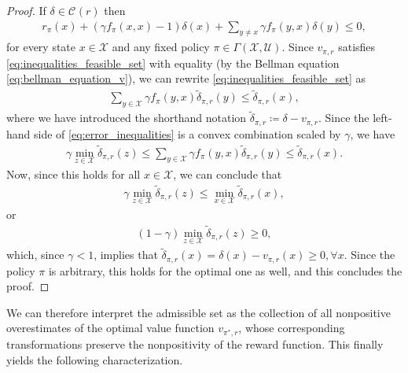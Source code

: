 \documentclass[10pt,leqno]{amsart}
\newcommand{\U}{\mathcal{U}}
\newcommand{\X}{\mathcal{X}}
\newcommand{\cost}{r}
\newcommand{\costfb}[1]{\cost_{#1}}
\newcommand{\vvarg}[1]{v_{#1}}
\newcommand{\f}{f}
\newcommand{\ffb}[1]{\f_{#1}}
\newcommand{\policy}{\pi}
\newcommand{\Sect}{\Gamma(\X, \U)}
\newcommand{\state}{x} %
\newcommand{\disc}{\gamma}
\newcommand{\advset}[2]{\mathcal{C}_{#1}(#2)}
\begin{document}
\begin{proof}
    If $\delta \in \advset{}{\cost}$ then
    \begin{align}\label{eq:inequalities_feasible_set}
        \costfb{\policy}(\state) + (\disc \text{$\ffb{\policy}(\state, \state)$} - 1) \delta(\state) + \sum_{y \neq \state} \disc \ffb{\policy}(y, \state) \delta(y) \leq 0,
    \end{align}
    for every state $\state \in \X$ and any fixed policy $\policy \in \Sect$. Since $\vvarg{\policy\!, \cost}$ satisfies \eqref{eq:inequalities_feasible_set} with equality (by the Bellman equation \eqref{eq:bellman_equation_v}), we can rewrite \eqref{eq:inequalities_feasible_set} as
    \begin{align}\label{eq:error_inequalities}
        \sum_{y \in \X} \disc \ffb{\policy}(y, \state) \tilde{\delta}_{\policy, \cost}(y) \leq \tilde{\delta}_{\policy, \cost}(\state),
    \end{align}
    where we have introduced the shorthand notation $\tilde{\delta}_{\policy, \cost} \coloneqq \delta - \vvarg{\policy\!, \cost}$. Since the left-hand side of \eqref{eq:error_inequalities} is a convex combination scaled by $\disc$, we have
    \begin{align*}
        \disc \min_{z \in \X} \tilde{\delta}_{\policy, \cost}(z) \leq \sum_{y \in \X} \disc \ffb{\policy}(y, \state) \tilde{\delta}_{\policy, \cost}(y) \leq \tilde{\delta}_{\policy, \cost}(\state).
    \end{align*}
    Now, since this holds for all $\state \in \X$, we can conclude that
    \begin{align*}
        \disc \min_{z \in \X} \tilde{\delta}_{\policy, \cost}(z) \leq \min_{x \in \X} \tilde{\delta}_{\policy, \cost}(x),
    \end{align*}
    or
    \begin{align*}
        (1 - \disc)\min_{z \in \X} \tilde{\delta}_{\policy, \cost}(z) \geq 0,
    \end{align*}
    which, since $\disc < 1$, implies that $\tilde{\delta}_{\policy, \cost}(\state) = \delta(\state) - \vvarg{\policy\!, \cost}(\state) \geq 0, \forall \state$. Since the policy $\policy$ is arbitrary, this holds for the optimal one as well, and this concludes the proof.
\end{proof}
\noindent
We can therefore interpret the admissible set as the collection of all nonpositive overestimates of the optimal value function $\vvarg{\policy^*\!, \cost}$, whose corresponding transformations preserve the nonpositivity of the reward function. This finally yields the following characterization.
\end{document}

